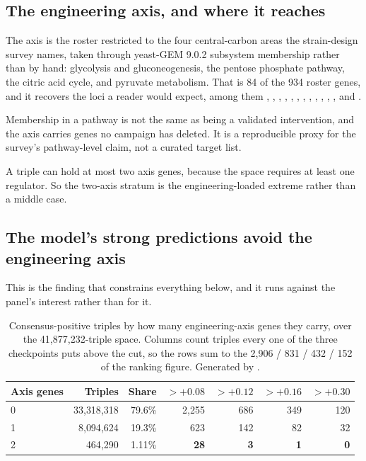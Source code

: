 \subsection{The engineering axis, and where it reaches}

The axis is the roster restricted to the four central-carbon areas the
strain-design survey names, taken through yeast-GEM 9.0.2 subsystem membership
rather than by hand: glycolysis and gluconeogenesis, the pentose phosphate
pathway, the citric acid cycle, and pyruvate metabolism. That is 84 of the 934
roster genes, and it recovers the loci a reader would expect, among them
, , , , , ,
, , , , , ,
 and .

Membership in a pathway is not the same as being a validated intervention, and
the axis carries genes no campaign has deleted. It is a reproducible proxy for
the survey's pathway-level claim, not a curated target list.

A triple can hold at most two axis genes, because the space requires at least one
regulator. So the two-axis stratum is the engineering-loaded extreme rather than
a middle case.

\subsection{The model's strong predictions avoid the engineering axis}

This is the finding that constrains everything below, and it runs against the
panel's interest rather than for it.

\begin{table}[H]
\centering
\footnotesize
\begin{tabular}{lrrrrrr}
\toprule
Axis genes & Triples & Share & $>+0.08$ & $>+0.12$ & $>+0.16$ & $>+0.30$ \\
\midrule
0 & 33{,}318{,}318 & 79.6\% & 2{,}255 & 686 & 349 & 120 \\
1 &  8{,}094{,}624 & 19.3\% &   623 & 142 &  82 &  32 \\
2 &    464{,}290 &  1.11\% &    \textbf{28} &   \textbf{3} &   \textbf{1} &   \textbf{0} \\
\bottomrule
\end{tabular}
\caption{Consensus-positive triples by how many engineering-axis genes they
carry, over the 41{,}877{,}232-triple space. Columns count triples every one of
the three checkpoints puts above the cut, so the rows sum to the 2{,}906 / 831 /
432 / 152 of the ranking figure. Generated by
\protect{}.}
\end{table}

